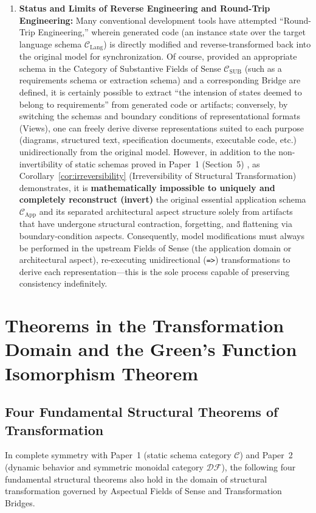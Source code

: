 \documentclass[11pt,a4paper]{article}
\theoremstyle{definition}
\theoremstyle{plain}
\theoremstyle{remark}
\newcommand{\CSUB}{\mathcal{C}_{\mathrm{SUB}}}
\begin{document}
\begin{enumerate}
    \item \textbf{Status and Limits of Reverse Engineering and Round-Trip Engineering:}
    Many conventional development tools have attempted ``Round-Trip Engineering,'' wherein generated code (an instance state over the target language schema $\mathcal{C}_{\mathrm{Lang}}$) is directly modified and reverse-transformed back into the original model for synchronization. Of course, provided an appropriate schema in the Category of Substantive Fields of Sense $\CSUB$ (such as a requirements schema or extraction schema) and a corresponding Bridge are defined, it is certainly possible to extract ``the intension of states deemed to belong to requirements'' from generated code or artifacts; conversely, by switching the schemas and boundary conditions of representational formats (Views), one can freely derive diverse representations suited to each purpose (diagrams, structured text, specification documents, executable code, etc.) unidirectionally from the original model.
    However, in addition to the non-invertibility of static schemas proved in Paper~1 (Section~5) \cite{ota2026paper1}, as Corollary~\ref{cor:irreversibility} (Irreversibility of Structural Transformation) demonstrates, it is \textbf{mathematically impossible to uniquely and completely reconstruct (invert)} the original essential application schema $\mathcal{C}_{\mathrm{App}}$ and its separated architectural aspect structure solely from artifacts that have undergone structural contraction, forgetting, and flattening via boundary-condition aspects. Consequently, model modifications must always be performed in the upstream Fields of Sense (the application domain or architectural aspect), re-executing unidirectional (\texttt{=>}) transformations to derive each representation---this is the sole process capable of preserving consistency indefinitely.
\end{enumerate}

\section{Theorems in the Transformation Domain and the Green's Function Isomorphism Theorem}

\subsection{Four Fundamental Structural Theorems of Transformation}
In complete symmetry with Paper~1 (static schema category $\mathcal{C}$) and Paper~2 (dynamic behavior and symmetric monoidal category $\mathcal{DF}$), the following four fundamental structural theorems also hold in the domain of structural transformation governed by Aspectual Fields of Sense and Transformation Bridges.
\end{document}
